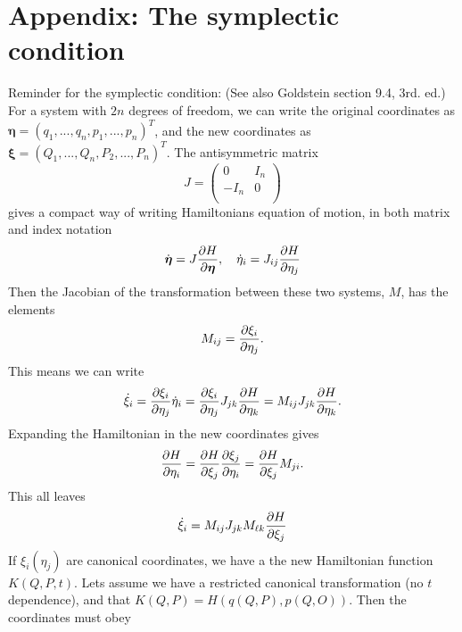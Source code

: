 \documentclass{article}
\begin{document}
    \section*{Appendix: The symplectic condition}
        Reminder for the symplectic condition: (See also Goldstein section 9.4, 3rd. ed.) For a system with $2n$ degrees of freedom, we can write the original coordinates as $\boldsymbol{\eta} = (q_1, ..., q_n, p_1, ..., p_n)^T$, and the new coordinates as $\boldsymbol{\xi} = (Q_1, ..., Q_n, P_2, ..., P_n)^T$. 
        The antisymmetric matrix
        \begin{equation*}
            J = \begin{pmatrix*}
                0 & I_n \\
                -I_n & 0 \\
            \end{pmatrix*}
        \end{equation*}
        gives a compact way of writing Hamiltonians equation of motion, in both matrix and index notation
        \begin{equation*}
            \dot{\boldsymbol{\eta}} = J \pdv{H}{\boldsymbol{\eta}}, \quad
            \dot \eta_i = J_{ij} \pdv{H}{\eta_j}
        \end{equation*}
        Then the Jacobian of the transformation between these two systems, $M$, has the elements
        \begin{equation*}
            M_{ij} = \pdv{\xi_i}{\eta_j}.
        \end{equation*}
        This means we can write 
        \begin{equation*}
            \dot \xi_i = \pdv{\xi_i}{\eta_j} \dot \eta_i = \pdv{\xi_i}{\eta_j} J_{jk} \pdv{H}{\eta_k} = M_{ij} J_{jk} \pdv{H}{\eta_k}.
        \end{equation*}
        Expanding the Hamiltonian in the new coordinates gives
        \begin{equation*}
            \pdv{H}{\eta_i} = \pdv{H}{\xi_j} \pdv{\xi_j}{\eta_i} = \pdv{H}{\xi_j} M_{ji}.
        \end{equation*}
        This all leaves
        \begin{equation*}
            \dot \xi_i = M_{ij} J_{jk} M_{\ell k} \pdv{H}{\xi_j}
        \end{equation*}
        If $\xi_i(\eta_j)$ are canonical coordinates, we have a the new Hamiltonian function $K(Q, P, t)$. Lets assume we have a restricted canonical transformation (no $t$ dependence), and that $K(Q, P) = H(q(Q, P), p(Q, O))$. Then the coordinates must obey
\end{document}
